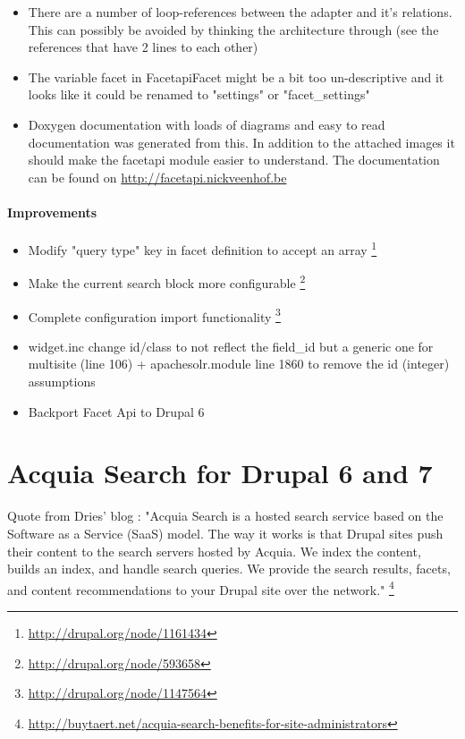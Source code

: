 \begin{itemize}
\item There are a number of loop-references between the adapter and it's relations. This can possibly be avoided by thinking the architecture through (see the references that have 2 lines to each other)
\item The variable facet in FacetapiFacet might be a bit too un-descriptive and it looks like it could be renamed to "settings" or "facet\_settings"
\item Doxygen documentation with loads of diagrams and easy to read documentation was generated from this. In addition to the attached images it should make the facetapi module easier to understand. The documentation can be found on \url{http://facetapi.nickveenhof.be}
\end{itemize}

\paragraph{Improvements}
\begin{itemize}
\item Modify "query type" key in facet definition to accept an array \footnote{\url{http://drupal.org/node/1161434}}
\item Make the current search block more configurable \footnote{\url{http://drupal.org/node/593658}}
\item Complete configuration import functionality \footnote{\url{http://drupal.org/node/1147564}}
\item widget.inc change id/class to not reflect the field\_id but a generic one for multisite (line 106) + apachesolr.module line 1860 to remove the id (integer) assumptions
\item Backport Facet Api to Drupal 6
\end{itemize}

\section{Acquia Search for Drupal 6 and 7}
Quote from Dries' blog : "Acquia Search is a hosted search service based on the Software as a Service (SaaS) model. The way it works is that Drupal sites push their content to the search servers hosted by Acquia. We index the content, builds an index, and handle search queries. We provide the search results, facets, and content recommendations to your Drupal site over the network." \footnote{\url{http://buytaert.net/acquia-search-benefits-for-site-administrators}}

